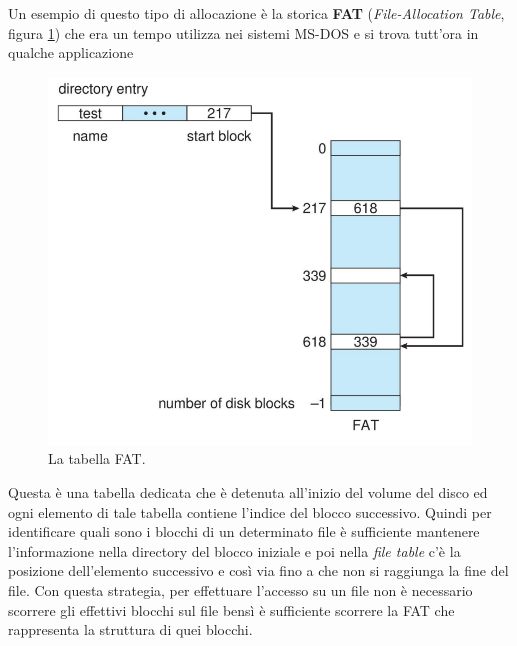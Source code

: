 Un esempio di questo tipo di allocazione è la storica \textbf{FAT} (\textit{File-Allocation Table}, figura \ref{fig:FAT})\label{FAT} che era un tempo utilizza nei sistemi MS-DOS e si trova tutt'ora in qualche applicazione
\begin{figure}[h]
    \centering
    \includegraphics[width = .55\textwidth]{../res/imgs/file system implementation/FAT.png}
    \caption{La tabella FAT.}
    \label{fig:FAT}
\end{figure}
Questa è una tabella dedicata che è detenuta all'inizio del volume del disco ed ogni elemento di tale tabella contiene l'indice del blocco successivo. Quindi per identificare quali sono i blocchi di un determinato file è sufficiente mantenere l'informazione nella directory del blocco iniziale e poi nella \textit{file table} c'è la posizione dell'elemento successivo e così via fino a che non si raggiunga la fine del file. Con questa strategia, per effettuare l'accesso su un file non è necessario scorrere gli effettivi blocchi sul file bensì è sufficiente scorrere la FAT che rappresenta la struttura di quei blocchi. 

% 
